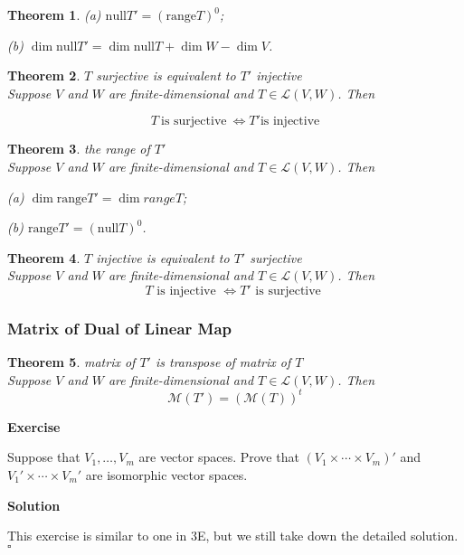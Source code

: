 \documentclass{article}
\newtheorem{theorem}{Theorem}[subsection]
\newenvironment{exercise}{%
{\textbf{Exercise\\}
    }
}{
}
\newenvironment{solution}{%
{
    \textbf{Solution\\}
    }
}{
  \hfill $\square$ 
  \par\bigskip 
}
\newcommand{\range}{\text{range}}
\newcommand{\n}{\text{null}}
\begin{document}
\begin{CJK}{UTF8}{gkai}
\begin{theorem}
 (a) $\n T' = (\range T)^0$;

 (b) $\dim \n T' = \dim \n T + \dim W - \dim V$.
\end{theorem}

\begin{theorem}
    $T$ surjective is equivalent to $T'$ injective\\

    Suppose $V$ and $W$ are finite-dimensional and $T \in \mathcal{L}(V,W)$. Then

    \[T ~\text{is surjective}~ \Leftrightarrow T' \text{is injective}\]
\end{theorem}

\begin{theorem}
    the range of $T'$\\

    Suppose $V$ and $W$ are finite-dimensional and $T \in \mathcal{L}(V,W)$. Then

    (a) $\dim \range T' = \dim range T$;
    
    (b) $\range T' = (\n T)^0$.\\
\end{theorem}

\begin{theorem}
    $T$ injective is equivalent to $T'$ surjective\\

    Suppose $V$ and $W$ are finite-dimensional and $T \in \mathcal{L}(V,W)$. Then
    \[T \text{~is injective~} \Leftrightarrow T' \text{~is surjective~}\]
\end{theorem}
\subsubsection{Matrix of Dual of Linear Map}
\begin{theorem}
    matrix of $T'$ is transpose of matrix of $T$\\

    Suppose $V$ and $W$ are finite-dimensional and $T \in \mathcal{L}(V,W)$. Then
    \[\mathcal{M}(T') = (\mathcal{M}(T))^t\] 
\end{theorem}

\begin{exercise}
    Suppose that $V_1,\ldots,V_m$ are vector spaces. Prove that $(V_1 \times  \cdots \times  V_m)'$ and $V_1' \times  \cdots\times V_m'$ are isomorphic vector spaces.
\end{exercise}

\begin{solution}
    This exercise is similar to one in 3E, but we still take down the detailed solution.\\


\end{solution}
\end{CJK}
\end{document}
